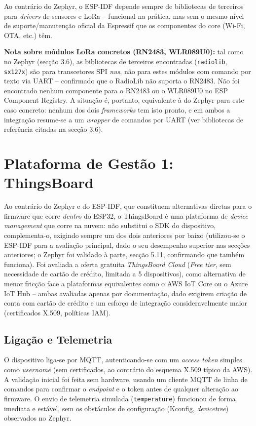 \documentclass[a4paper,12pt]{article}
\begin{document}
Ao contrário do Zephyr, o ESP-IDF depende sempre de bibliotecas de terceiros para \textit{drivers} de sensores e LoRa -- funcional na prática, mas sem o mesmo nível de suporte/manutenção oficial da Espressif que os componentes do core (Wi-Fi, OTA, etc.) têm.

\textbf{Nota sobre módulos LoRa concretos (RN2483, WLR089U0):} tal como no Zephyr (secção 3.6), as bibliotecas de terceiros encontradas (\texttt{radiolib}, \texttt{sx127x}) são para transcetores SPI \textit{nus}, não para estes módulos com comando por texto via UART -- confirmado que o RadioLib não suporta o RN2483. Não foi encontrado nenhum componente para o RN2483 ou o WLR089U0 no ESP Component Registry. A situação é, portanto, equivalente à do Zephyr para este caso concreto: nenhum dos dois \textit{frameworks} tem isto pronto, e em ambos a integração resume-se a um \textit{wrapper} de comandos por UART (ver bibliotecas de referência citadas na secção 3.6).

\section{Plataforma de Gestão 1: ThingsBoard}
Ao contrário do Zephyr e do ESP-IDF, que constituem alternativas diretas para o firmware que corre \textit{dentro} do ESP32, o ThingsBoard é uma plataforma de \textit{device management} que corre na nuvem: não substitui o SDK do dispositivo, complementa-o, exigindo sempre um dos dois anteriores por baixo (utilizou-se o ESP-IDF para a avaliação principal, dado o seu desempenho superior nas secções anteriores; o Zephyr foi validado à parte, secção 5.11, confirmando que também funciona). Foi avaliada a oferta gratuita \textit{ThingsBoard Cloud} (\textit{Free tier}, sem necessidade de cartão de crédito, limitada a 5 dispositivos), como alternativa de menor fricção face a plataformas equivalentes como o AWS IoT Core ou o Azure IoT Hub -- ambas avaliadas apenas por documentação, dado exigirem criação de conta com cartão de crédito e um esforço de integração consideravelmente maior (certificados X.509, políticas IAM).

\subsection{Ligação e Telemetria}
O dispositivo liga-se por MQTT, autenticando-se com um \textit{access token} simples como \textit{username} (sem certificados, ao contrário do esquema X.509 típico da AWS). A validação inicial foi feita sem hardware, usando um cliente MQTT de linha de comandos para confirmar o \textit{endpoint} e o token antes de qualquer alteração ao firmware. O envio de telemetria simulada (\texttt{temperature}) funcionou de forma imediata e estável, sem os obstáculos de configuração (Kconfig, \textit{devicetree}) observados no Zephyr.
\end{document}
